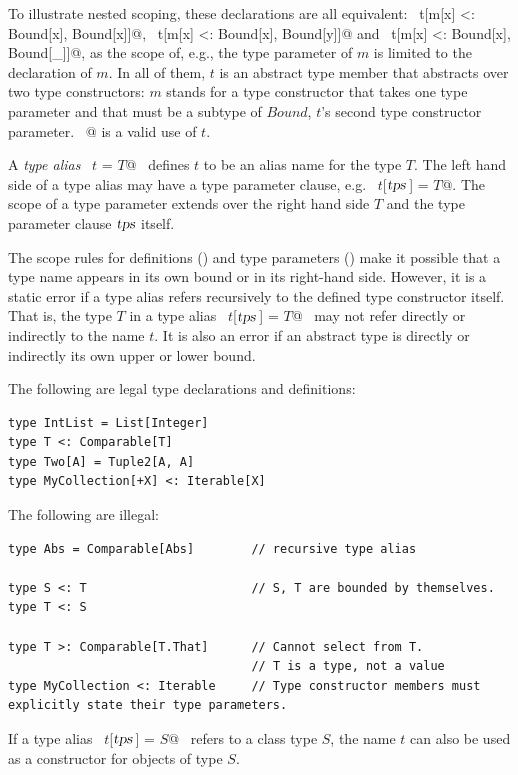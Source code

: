 To illustrate nested scoping, these declarations are all equivalent: ~\lstinline@type t[m[x] <: Bound[x], Bound[x]]@, ~\lstinline@type t[m[x] <: Bound[x], Bound[y]]@ and ~\lstinline@type t[m[x] <: Bound[x], Bound[_]]@, as the scope of, e.g., the type parameter of $m$ is limited to the declaration of $m$. In all of them, $t$ is an abstract type member that abstracts over two type constructors: $m$ stands for a type constructor that takes one type parameter and that must be a subtype of $Bound$, $t$'s second type constructor parameter. ~@ is a valid use of $t$.

A {\em type alias} ~\lstinline@type $t$ = $T$@~ defines $t$ to be an alias
name for the type $T$.  The left hand side of a type alias may
have a type parameter clause, e.g. ~\lstinline@type $t$[$\mbox{\sl tps}\,$] = $T$@.  The scope
of a type parameter extends over the right hand side $T$ and the
type parameter clause $\mbox{\sl tps}$ itself.  

The scope rules for definitions () and type parameters
() make it possible that a type name appears in its
own bound or in its right-hand side.  However, it is a static error if
a type alias refers recursively to the defined type constructor itself.  
That is, the type $T$ in a type alias ~\lstinline@type $t$[$\mbox{\sl tps}\,$] = $T$@~ may not 
refer directly or indirectly to the name $t$.  It is also an error if
an abstract type is directly or indirectly its own upper or lower bound.

\example The following are legal type declarations and definitions:
\begin{lstlisting}
type IntList = List[Integer]
type T <: Comparable[T]
type Two[A] = Tuple2[A, A]
type MyCollection[+X] <: Iterable[X]
\end{lstlisting}

The following are illegal:
\begin{lstlisting}
type Abs = Comparable[Abs]        // recursive type alias

type S <: T                       // S, T are bounded by themselves.
type T <: S

type T >: Comparable[T.That]      // Cannot select from T.
                                  // T is a type, not a value
type MyCollection <: Iterable     // Type constructor members must explicitly state their type parameters.
\end{lstlisting}

If a type alias ~\lstinline@type $t$[$\mbox{\sl tps}\,$] = $S$@~ refers to a class type
$S$, the name $t$ can also be used as a constructor for
objects of type $S$.


